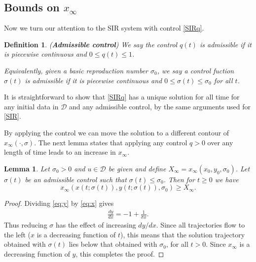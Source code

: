 \documentclass[english,12pt,letter]{article}
\newtheorem{lem}{Lemma}
\newtheorem{dfn}{Definition}
\newcommand{\Rnot}{\sigma_0}
\newcommand{\Sinf}{x_\infty}
\newcommand{\dom}{{\mathcal D}}
\begin{document}

\subsection{Bounds on $\Sinf$}
Now we turn our attention to the SIR system with control \eqref{SIRq}.

\begin{dfn} ({\bf Admissible control})
We say the control $q(t)$ is admissible if it is piecewise continuous and $0\le q(t) \le 1$.

Equivalently, given a basic reproduction number $\Rnot$, we say a control fuction $\sigma(t)$ is
admissible if it is piecewise continuous and $0\le \sigma(t) \le \sigma_0$ for all $t$.
\end{dfn}

It is straightforward to show that \eqref{SIRq} has a unique solution for all time
for any initial data in $\dom$ and any admissible control, by the same
arguments used for \eqref{SIR}.


By applying the control we can move the solution to a different contour of
$x_\infty(\cdot,\sigma)$.  The next lemma states that applying any control $q>0$ over
any length of time leads to an increase in $x_\infty$.
\begin{lem}
Let $\Rnot>0$ and $u\in\dom$ be given and define $X_\infty = x_\infty(x_0,y_0,\Rnot)$.
Let $\sigma(t)$ be an admissible control such that $\sigma(t)\le \sigma_0$.
Then for $t\ge0$ we have
$$
    x_\infty(x(t;\sigma(t)),y(t;\sigma(t)),\Rnot) \ge X_\infty.
$$
\end{lem}
\begin{proof}
    Dividing \eqref{eq:y} by \eqref{eq:x} gives
    \begin{align} \label{eq:dydx}
        \frac{dy}{dx} = -1 + \frac{1}{\sigma x}.
    \end{align}
    Thus reducing $\sigma$ has the effect of increasing $dy/dx$.
    Since all trajectories flow to the left ($x$ is a decreasing function of $t$),
    this means that the solution trajectory obtained with $\sigma(t)$ lies
    below that obtained with $\sigma_0$, for all $t>0$.  Since
    $\Sinf$ is a decreasing function of $y$, this completes the proof.
\end{proof}
\end{document}

